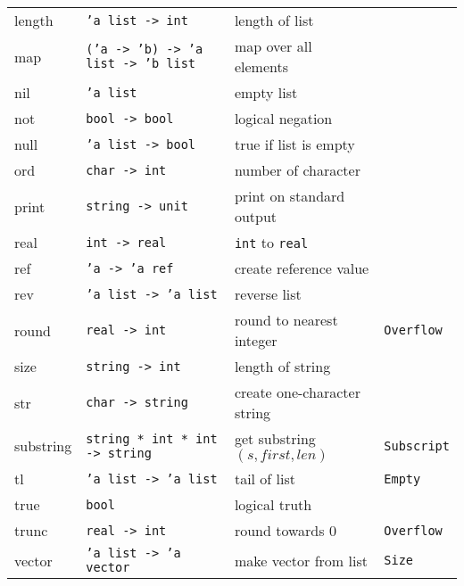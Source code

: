 \documentclass[fleqn,a4paper]{article}
\begin{document}
\begin{tabular}{@{\tt\ \ }llll}
length      & {\tt 'a list -> int}        & length of list\\

map         & {\tt ('a -> 'b) -> 'a list -> 'b list}
            & map over all elements\\

nil         & {\tt 'a list} &               empty list\\

not         & {\tt bool -> bool} &          logical negation\\

null        & {\tt 'a list -> bool}       & true if list is empty\\

ord         & {\tt char -> int} &           number of character\\

print       & {\tt string -> unit} & print on standard output\\

real        & {\tt int -> real} &           {\tt int} to {\tt real}\\

ref         & {\tt 'a -> 'a ref} &       create reference value\\

rev         & {\tt 'a list -> 'a list}    & reverse list\\

round       & {\tt real -> int} &           round to nearest integer 
        & {\tt Overflow}\\

size        & {\tt string -> int} &         length of string\\

str         & {\tt char -> string} &        create one-character string\\

substring   & {\tt string * int * int -> string} & get substring
$(s, first, len)$ & {\tt Subscript}\\

tl          & {\tt 'a list -> 'a list}    & tail of list & {\tt Empty}\\

true        & {\tt bool} & logical truth \\

trunc       & {\tt real -> int} &           round towards $0$ 
        & {\tt Overflow}\\

vector      & {\tt 'a list -> 'a vector} & make vector from list & 
              {\tt Size}\\\hline 
\end{tabular}
\end{document}

